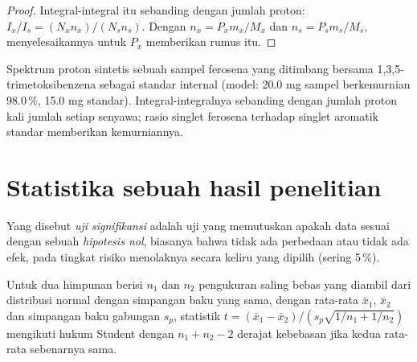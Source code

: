 \begin{proof}
Integral-integral itu sebanding dengan jumlah proton: $I_x/I_s = (N_xn_x)/(N_sn_s)$. Dengan
$n_x = P_xm_x/M_x$ dan $n_s = P_sm_s/M_s$, menyelesaikannya untuk $P_x$ memberikan rumus itu.
\end{proof}

\begin{omfigure}

{\small Spektrum proton sintetis sebuah sampel ferosena yang ditimbang bersama
1,3,5-trimetoksibenzena sebagai standar internal (model: 20.0 mg sampel berkemurnian
98.0\,\%, 15.0 mg standar). Integral-integralnya sebanding dengan jumlah
proton kali jumlah setiap senyawa; rasio singlet ferosena terhadap
singlet aromatik standar memberikan kemurniannya.}
\end{omfigure}

\section{Statistika sebuah hasil penelitian}

\begin{definition}\label{def:b3:lab-techniques-3:tests}
Yang disebut \emph{uji signifikansi} adalah uji yang memutuskan apakah data
sesuai dengan sebuah \emph{hipotesis nol}, biasanya bahwa
tidak ada perbedaan atau tidak ada efek, pada tingkat risiko menolaknya secara
keliru yang dipilih (sering 5\,\%).
\end{definition}

\begin{theorem}\label{thm:b3:lab-techniques-3:t-test}
Untuk dua himpunan berisi $n_1$ dan $n_2$ pengukuran saling bebas yang diambil dari distribusi
normal dengan simpangan baku yang sama, dengan rata-rata $\bar x_1$, $\bar x_2$ dan simpangan baku
gabungan $s_p$, statistik $t = (\bar x_1 - \bar x_2)/(s_p\sqrt{1/n_1 + 1/n_2})$ mengikuti hukum Student dengan
$n_1 + n_2 - 2$ derajat kebebasan jika kedua rata-rata sebenarnya sama. \admitted
\end{theorem}

